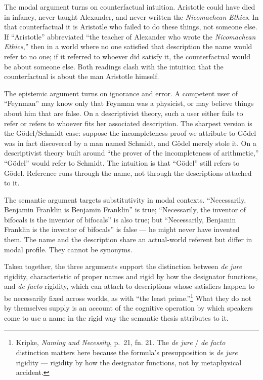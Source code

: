 \documentclass[12pt,a4paper]{article}
\begin{document}
The modal argument turns on counterfactual intuition. Aristotle could have died in infancy, never taught Alexander, and never written the \emph{Nicomachean Ethics}. In that counterfactual it is Aristotle who failed to do these things, not someone else. If ``Aristotle'' abbreviated ``the teacher of Alexander who wrote the \emph{Nicomachean Ethics},'' then in a world where no one satisfied that description the name would refer to no one; if it referred to whoever did satisfy it, the counterfactual would be about someone else. Both readings clash with the intuition that the counterfactual is about the man Aristotle himself.

The epistemic argument turns on ignorance and error. A competent user of ``Feynman'' may know only that Feynman was a physicist, or may believe things about him that are false. On a descriptivist theory, such a user either fails to refer or refers to whoever fits her associated description. The sharpest version is the Gödel/Schmidt case: suppose the incompleteness proof we attribute to Gödel was in fact discovered by a man named Schmidt, and Gödel merely stole it. On a descriptivist theory built around ``the prover of the incompleteness of arithmetic,'' ``Gödel'' would refer to Schmidt. The intuition is that ``Gödel'' still refers to Gödel. Reference runs through the name, not through the descriptions attached to it.

The semantic argument targets substitutivity in modal contexts. ``Necessarily, Benjamin Franklin is Benjamin Franklin'' is true; ``Necessarily, the inventor of bifocals is the inventor of bifocals'' is also true; but ``Necessarily, Benjamin Franklin is the inventor of bifocals'' is false --- he might never have invented them. The name and the description share an actual-world referent but differ in modal profile. They cannot be synonyms.

Taken together, the three arguments support the distinction between \emph{de jure} rigidity, characteristic of proper names and rigid by how the designator functions, and \emph{de facto} rigidity, which can attach to descriptions whose satisfiers happen to be necessarily fixed across worlds, as with ``the least prime.''\footnote{Kripke, \emph{Naming and Necessity}, p.~21, fn. 21. The \emph{de jure} / \emph{de facto} distinction matters here because the formula's presupposition is \emph{de jure} rigidity --- rigidity by how the designator functions, not by metaphysical accident.} What they do not by themselves supply is an account of the cognitive operation by which speakers come to use a name in the rigid way the semantic thesis attributes to it.
\end{document}
